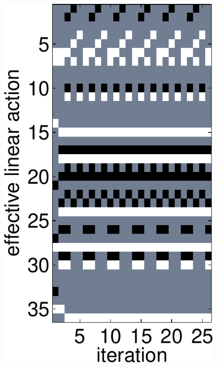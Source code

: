 \documentclass[12pt]{article}
\begin{document}
\begin{figure}
\begin{center}
{  \includegraphics[height=.35\textheight]{efflinact2}
  \label{fig:efflinact2}
}\hspace{.5em}
\subfigure[]{
}
\end{center}
\end{figure}
\end{document}
